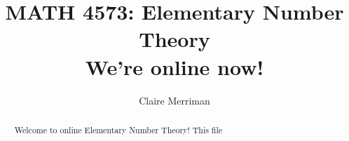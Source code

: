 \documentclass{xourse}
\title{MATH 4573: Elementary Number Theory\\We're online now!}
\author{Claire Merriman}
\begin{document}
  
\begin{abstract} %
Welcome to online Elementary Number Theory! This file 
\end{abstract}  
\maketitle 
 
 
\end{document}
